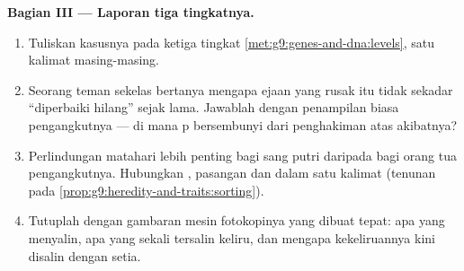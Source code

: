 \begin{problem}
\medskip\noindent\textbf{Bagian III --- Laporan tiga
tingkatnya.}
\begin{enumerate}[resume]
  \item Tuliskan kasusnya pada ketiga tingkat
        \cref{met:g9:genes-and-dna:levels}, satu kalimat
        masing-masing.
  \item Seorang teman sekelas bertanya mengapa ejaan yang
        rusak itu tidak sekadar ``diperbaiki hilang'' sejak
        lama. Jawablah dengan penampilan biasa pengangkutnya
        --- di mana p bersembunyi dari penghakiman atas
        akibatnya?
  \item Perlindungan matahari lebih penting bagi sang putri
        daripada bagi orang tua pengangkutnya. Hubungkan
        , pasangan  dan  dalam satu
        kalimat (tenunan pada
        \cref{prop:g9:heredity-and-traits:sorting}).
  \item Tutuplah dengan gambaran mesin fotokopinya yang
        dibuat tepat: apa yang menyalin, apa yang sekali
        tersalin keliru, dan mengapa kekeliruannya kini
        disalin dengan setia.
\end{enumerate}
\end{problem}
